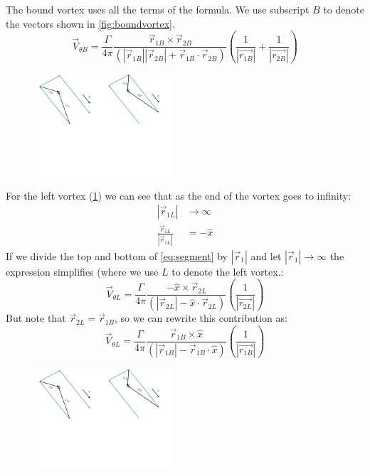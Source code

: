 \documentclass{article}
\begin{document}
The bound vortex uses all the terms of the formula. We use subscript $B$ to denote the vectors shown in \cref{fig:boundvortex}.
\begin{equation}
\vec{V}_{\theta B} = \frac{\Gamma}{4 \pi} \frac{\vec{r}_{1B} \times \vec{r}_{2B}}{(|\vec{r}_{1B}||\vec{r}_{2B}| + \vec{r}_{1B} \cdot \vec{r}_{2B})} \left(\frac{1}{|\vec{r_{1B}}|} + \frac{1}{|\vec{r_{2B}}|} \right)
\end{equation}

\begin{figure}[htbp]
\centering
\includegraphics[width=2in]{figs/leftvortex}
\caption{}
\label{fig:leftvortex}
\end{figure}

For the left vortex (\cref{fig:leftvortex})
we can see that as the end of the vortex goes to infinity:
\begin{align}
|\vec{r}_{1L}| &\rightarrow \infty\\
\frac{\vec{r}_{1L}}{|\vec{r}_{1L}|} &= -\hat{x}
\end{align}
If we divide the top and bottom of \cref{eq:segment} by $|\vec{r}_1|$ and let $|\vec{r}_1| \rightarrow \infty$ the expression simplifies (where we use $L$ to denote the left vortex.:
\begin{equation}
\vec{V}_{\theta L} = \frac{\Gamma}{4 \pi} \frac{-\hat{x} \times \vec{r}_{2L}}{(|\vec{r}_{2L}| - \hat{x} \cdot \vec{r}_{2L})} \left(\frac{1}{|\vec{r_{2L}}|} \right)
\end{equation}
But note that $\vec{r}_{2L} = \vec{r}_{1B}$, so we can rewrite this contribution as:
\begin{equation}
\vec{V}_{\theta L} = \frac{\Gamma}{4 \pi} \frac{\vec{r}_{1B} \times \hat{x}}{(|\vec{r}_{1B}| - \vec{r}_{1B} \cdot \hat{x})} \left(\frac{1}{|\vec{r_{1B}}|} \right)
\end{equation}

\begin{figure}[htbp]
\centering
\includegraphics[width=2in]{figs/rightvortex}
\caption{}
\label{fig:rightvortex}
\end{figure}
\end{document}
